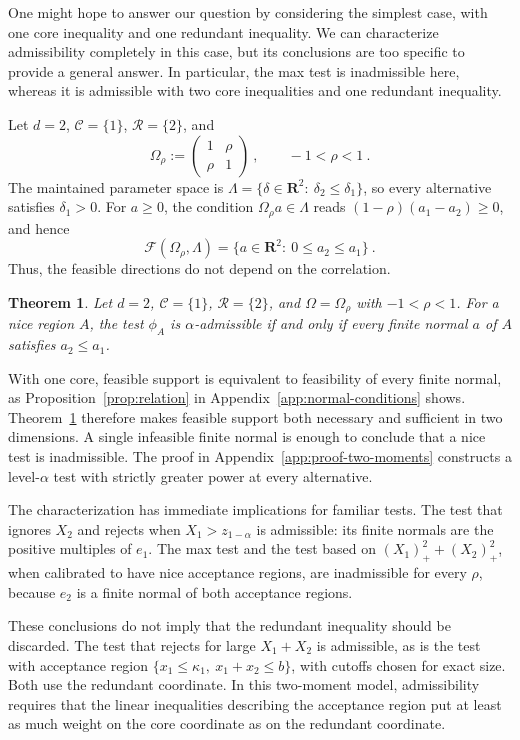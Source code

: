 \documentclass[11pt]{article}
\numberwithin{equation}{section}
\newtheorem{theorem}{Theorem}
\theoremstyle{definition}
\begin{document}
One might hope to answer our question by considering the simplest case, with one core inequality and one redundant inequality. We can characterize admissibility completely in this case, but its conclusions are too specific to provide a general answer. In particular, the max test is inadmissible here, whereas it is admissible with two core inequalities and one redundant inequality.

Let $d=2$, $\mathcal C=\{1\}$, $\mathcal R=\{2\}$, and
\[
\Omega_\rho:=\begin{pmatrix}1&\rho\\ \rho&1\end{pmatrix}~,
\qquad -1<\rho<1~.
\]
The maintained parameter space is $\Lambda=\{\delta\in\mathbf R^2:\ \delta_2\le\delta_1\}$, so every alternative satisfies $\delta_1>0$. For $a\ge0$, the condition $\Omega_\rho a\in\Lambda$ reads $(1-\rho)(a_1-a_2)\ge0$, and hence
\[
\mathcal F(\Omega_\rho,\Lambda)=\{a\in\mathbf R^2:\ 0\le a_2\le a_1\}~.
\]
Thus, the feasible directions do not depend on the correlation.

\begin{theorem}\label{thm:two-moments}
Let $d=2$, $\mathcal C=\{1\}$, $\mathcal R=\{2\}$, and $\Omega=\Omega_\rho$ with $-1<\rho<1$. For a nice region $A$, the test $\phi_A$ is $\alpha$-admissible if and only if every finite normal $a$ of $A$ satisfies $a_2\le a_1$.
\end{theorem}

With one core, feasible support is equivalent to feasibility of every finite normal, as Proposition~\ref{prop:relation} in Appendix~\ref{app:normal-conditions} shows. Theorem~\ref{thm:two-moments} therefore makes feasible support both necessary and sufficient in two dimensions. A single infeasible finite normal is enough to conclude that a nice test is inadmissible. The proof in Appendix~\ref{app:proof-two-moments} constructs a level-$\alpha$ test with strictly greater power at every alternative.

The characterization has immediate implications for familiar tests. The test that ignores $X_2$ and rejects when $X_1>z_{1-\alpha}$ is admissible: its finite normals are the positive multiples of $e_1$. The max test and the test based on $(X_1)_+^2+(X_2)_+^2$, when calibrated to have nice acceptance regions, are inadmissible for every $\rho$, because $e_2$ is a finite normal of both acceptance regions.

These conclusions do not imply that the redundant inequality should be discarded. The test that rejects for large $X_1+X_2$ is admissible, as is the test with acceptance region $\{x_1\le\kappa_1,\ x_1+x_2\le b\}$, with cutoffs chosen for exact size. Both use the redundant coordinate. In this two-moment model, admissibility requires that the linear inequalities describing the acceptance region put at least as much weight on the core coordinate as on the redundant coordinate.
\end{document}

